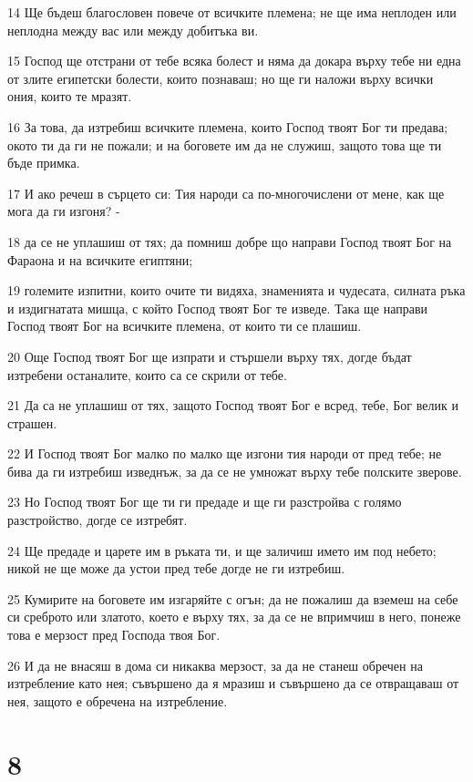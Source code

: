 \par 14 Ще бъдеш благословен повече от всичките племена; не ще има неплоден или неплодна между вас или между добитъка ви.
\par 15 Господ ще отстрани от тебе всяка болест и няма да докара върху тебе ни една от злите египетски болести, които познаваш; но ще ги наложи върху всички ония, които те мразят.
\par 16 За това, да изтребиш всичките племена, които Господ твоят Бог ти предава; окото ти да ги не пожали; и на боговете им да не служиш, защото това ще ти бъде примка.
\par 17 И ако речеш в сърцето си: Тия народи са по-многочислени от мене, как ще мога да ги изгоня? -
\par 18 да се не уплашиш от тях; да помниш добре що направи Господ твоят Бог на Фараона и на всичките египтяни;
\par 19 големите изпитни, които очите ти видяха, знаменията и чудесата, силната ръка и издигнатата мишца, с който Господ твоят Бог те изведе. Така ще направи Господ твоят Бог на всичките племена, от които ти се плашиш.
\par 20 Още Господ твоят Бог ще изпрати и стършели върху тях, догде бъдат изтребени останалите, които са се скрили от тебе.
\par 21 Да са не уплашиш от тях, защото Господ твоят Бог е всред, тебе, Бог велик и страшен.
\par 22 И Господ твоят Бог малко по малко ще изгони тия народи от пред тебе; не бива да ги изтребиш изведнъж, за да се не умножат върху тебе полските зверове.
\par 23 Но Господ твоят Бог ще ти ги предаде и ще ги разстройва с голямо разстройство, догде се изтребят.
\par 24 Ще предаде и царете им в ръката ти, и ще заличиш името им под небето; никой не ще може да устои пред тебе догде не ги изтребиш.
\par 25 Кумирите на боговете им изгаряйте с огън; да не пожалиш да вземеш на себе си среброто или златото, което е върху тях, за да се не впримчиш в него, понеже това е мерзост пред Господа твоя Бог.
\par 26 И да не внасяш в дома си никаква мерзост, за да не станеш обречен на изтребление като нея; съвършено да я мразиш и съвършено да се отвращаваш от нея, защото е обречена на изтребление.

\chapter{8}


